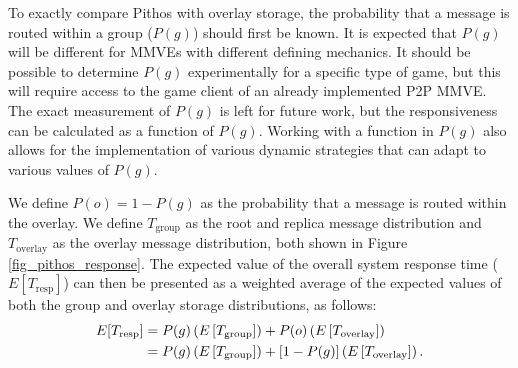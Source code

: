 \documentclass[10pt,a4paper,conference]{IEEEtran}
\begin{document}
To exactly compare Pithos with overlay storage, the probability that a message is routed within a group ($P(g)$) should first be known. It is
expected that $P(g)$ will be different for MMVEs with different defining mechanics. It should be possible to determine $P(g)$ experimentally for a
specific type of game, but this will require access to the game client of an already implemented P2P MMVE. The exact measurement of $P(g)$ is left
for future work, but the responsiveness can be calculated as a function of $P(g)$. Working with a function in $P(g)$ also allows for the
implementation of various dynamic strategies that can adapt to various values of $P(g)$.

We define $P(o) = 1 - P(g)$ as the probability that a message is routed within the overlay. We define $T_{\textrm{group}}$ as the root and replica
message distribution and $T_{\textrm{overlay}}$ as the overlay message distribution, both shown in Figure \ref{fig_pithos_response}. The expected
value of the overall system response time ($E[T_{\textrm{resp}}]$) can then be presented as a weighted average of the expected values of both the
group and overlay storage distributions, as follows:
%
\begin{align}
    E[T_{\textrm{resp}}] &= P(g)\left(E\left[T_{\textrm{group}}\right]\right) + P(o)\left(E\left[T_{\textrm{overlay}}\right]\right)\notag\\
                         &= P(g)\left(E\left[T_{\textrm{group}}\right]\right) + \left[1 - P(g)\right]\left(E\left[T_{\textrm{overlay}}\right]\right).\label{expected_response_time}
\end{align}
\end{document}
